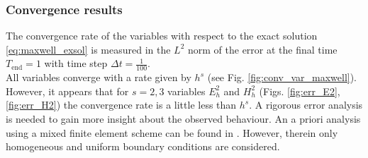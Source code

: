 \documentclass{elsarticle}
\begin{document}
\subsubsection{Convergence results}
The convergence rate of the variables with respect to the exact solution \eqref{eq:maxwell_exsol} is measured in the $L^2$ norm of the error at the final time $T_{\mathrm{end}}=1$ with time step $\Delta t = \frac{1}{100}$. \\

All variables converge with a rate given by $h^s$ (see Fig. \ref{fig:conv_var_maxwell}). However, it appears that for $s=2, 3$ variables $E^2_h$ and $H^2_h$ (Figs. \ref{fig:err_E2}, \ref{fig:err_H2}) the convergence rate is a little less than $h^s$. A rigorous error analysis is needed to gain more insight about the observed behaviour. An a priori analysis using a mixed finite element scheme can be found in \cite{asad2019maxwell}. However, therein only homogeneous and uniform boundary conditions are considered.
\end{document}
